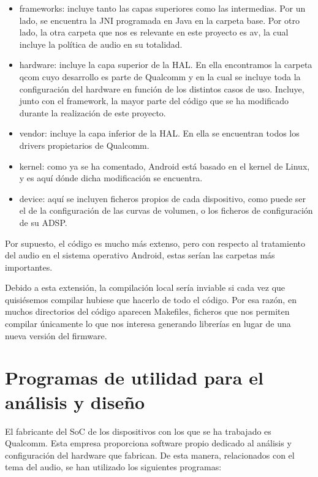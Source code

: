 \begin{itemize}
	\item{frameworks: incluye tanto las capas superiores como las intermedias. Por un lado, se encuentra la \gls{JNI} programada en Java en la carpeta base. Por otro lado, la otra carpeta que nos es relevante en este proyecto es av, la cual incluye la política de audio en su totalidad.}
	\item{hardware: incluye la capa superior de la \gls{HAL}. En ella encontramos la carpeta qcom cuyo desarrollo es parte de Qualcomm y en la cual se incluye toda la configuración del hardware en función de los distintos casos de uso. Incluye, junto con el framework, la mayor parte del código que se ha modificado durante la realización de este proyecto.}
	\item{vendor: incluye la capa inferior de la \gls{HAL}. En ella se encuentran todos los drivers propietarios de Qualcomm.}
	\item{kernel: como ya se ha comentado, Android está basado en el kernel de Linux, y es aquí dónde dicha modificación se encuentra.}
	\item{device: aquí se incluyen ficheros propios de cada dispositivo, como puede ser el de la configuración de las curvas de volumen, o los ficheros de configuración de su \gls{ADSP}.}	
\end{itemize}

Por supuesto, el código es mucho más extenso, pero con respecto al tratamiento del audio en el sistema operativo Android, estas serían las carpetas más importantes.

Debido a esta extensión, la compilación local sería inviable si cada vez que quisiésemos compilar hubiese que hacerlo de todo el código. Por esa razón, en muchos directorios del código aparecen Makefiles, ficheros que nos permiten compilar únicamente lo que nos interesa generando librerías en lugar de una nueva versión del firmware.


\section{Programas de utilidad para el análisis y diseño}
El fabricante del \gls{SoC} de los dispositivos con los que se ha trabajado es Qualcomm. Esta empresa proporciona software propio dedicado al análisis y configuración del hardware que fabrican. De esta manera, relacionados con el tema del audio, se han utilizado los siguientes programas:

